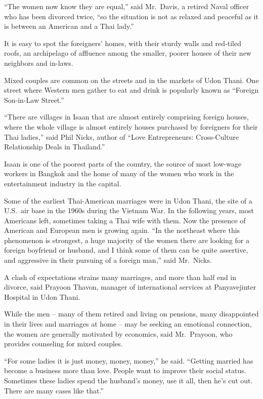 ﻿\documentclass[12pt]{article}
\begin{document}
``The women now know they are equal,'' said Mr.~Davis, a retired Naval officer who has been divorced
twice, ``so the situation is not as relaxed and peaceful as it is between an American and a Thai
lady.''

It is easy to spot the foreigners' homes, with their sturdy walls and red-tiled roofs, an
archipelago of affluence among the smaller, poorer houses of their new neighbors and in-laws.

Mixed couples are common on the streets and in the markets of Udon Thani. One street where Western
men gather to eat and drink is popularly known as ``Foreign Son-in-Law Street.''

``There are villages in Isaan that are almost entirely comprising foreign houses, where the whole
village is almost entirely houses purchased by foreigners for their Thai ladies,'' said Phil Nicks,
author of ``Love Entrepreneurs: Cross-Culture Relationship Deals in Thailand.''

Isaan is one of the poorest parts of the country, the source of most low-wage workers in Bangkok and
the home of many of the women who work in the entertainment industry in the capital.

Some of the earliest Thai-American marriages were in Udon Thani, the site of a U.S.~air base in the
1960s during the Vietnam War. In the following years, most Americans left, sometimes taking a Thai
wife with them. Now the presence of American and European men is growing again. ``In the northeast
where this phenomenon is strongest, a huge majority of the women there are looking for a foreign
boyfriend or husband, and I think some of them can be quite assertive, and aggressive in their
pursuing of a foreign man,'' said Mr.~Nicks.

A clash of expectations strains many marriages, and more than half end in divorce, said Prayoon
Thavon, manager of international services at Panyavejinter Hospital in Udon Thani.

While the men -- many of them retired and living on pensions, many disappointed in their lives and
marriages at home -- may be seeking an emotional connection, the women are generally motivated by
economics, said Mr.~Prayoon, who provides counseling for mixed couples.

``For some ladies it is just money, money, money,'' he said. ``Getting married has become a business
more than love. People want to improve their social status. Sometimes these ladies spend the
husband's money, use it all, then he's cut out. There are many cases like that.''
\end{document}
